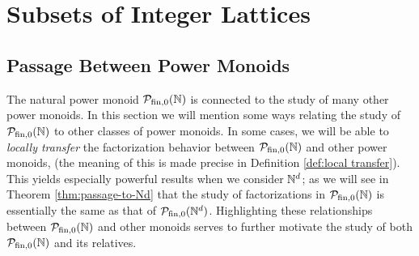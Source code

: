 
\chapter{Subsets of Integer Lattices} \label{ch:applications}
\section{Passage Between Power Monoids}\label{sec:passage}


The natural power monoid ${\mathcal{P}_{\textrm{fin},0}(\mathbb{N})}$ is connected to the study of many other power monoids.
In this section we will mention some ways relating the study of ${\mathcal{P}_{\textrm{fin},0}(\mathbb{N})}$ to other classes of power monoids.
In some cases, we will be able to \textit{locally transfer} the factorization behavior between ${\mathcal{P}_{\textrm{fin},0}(\mathbb{N})}$ and other power monoids, (the meaning of this is made precise in Definition \ref{def:local transfer}).
This yields especially powerful results when we consider $\mathbb{N}^d$; as we will see in Theorem \ref{thm:passage-to-Nd} that the study of factorizations in ${\mathcal{P}_{\textrm{fin},0}(\mathbb{N})}$ is essentially the same as that of $\mathcal{P}_{\textrm{fin}, 0}(\mathbb{N}^d)$.
Highlighting these relationships between ${\mathcal{P}_{\textrm{fin},0}(\mathbb{N})}$ and other monoids serves to further motivate the study of both ${\mathcal{P}_{\textrm{fin},0}(\mathbb{N})}$ and its relatives.






